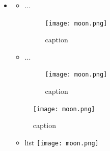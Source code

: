 \documentclass[12pt,letterpaper]{article}
\begin{document}
{\begin{section}
\begin{subsection}
\begin{center}
% 
% 
	\end{center}
  \end{subsection}
 
	\newpage
	
	\begin{itemize}
	\item[\ding{229}]{}

	\begin{itemize}
	    \item[\ding{237}]{...
		\begin{figure}[htb]
		    \centering
		    \texttt{[image: moon.png]}
		    \caption{caption}
		    \label{luna}
		\end{figure}
	    }
	\end{itemize}

	\begin{itemize}
	    \item[\ding{237}]{...
		\begin{figure}[htb]
		    \centering
		    \texttt{[image: moon.png]}
		    \caption{caption}
		    \label{luna}
		\end{figure}
	    }
	\end{itemize}

	\begin{figure}[htb]
	    \centering
	    \texttt{[image: moon.png]}
	    \caption{caption}
	    \label{luna}
	\end{figure}

	
	\begin{itemize}
	\item[\ding{182}]{ list  \texttt{[image: moon.png]}}
	\end{itemize}
    \end{itemize}
  \end{section}


}
\end{document}
